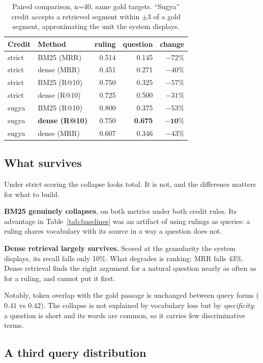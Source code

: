\documentclass[11pt,a4paper]{article}
\begin{document}
\begin{table}[h]
\centering
\begin{tabular}{llrrr}
\toprule
Credit & Method & ruling & question & change \\
\midrule
strict & BM25 (MRR) & 0.514 & 0.145 & $-72\%$ \\
strict & dense (MRR) & 0.451 & 0.271 & $-40\%$ \\
strict & BM25 (R@10) & 0.750 & 0.325 & $-57\%$ \\
strict & dense (R@10) & 0.725 & 0.500 & $-31\%$ \\
\midrule
sugya & BM25 (R@10) & 0.800 & 0.375 & $-53\%$ \\
sugya & \textbf{dense (R@10)} & 0.750 & \textbf{0.675} & $\mathbf{-10\%}$ \\
sugya & dense (MRR) & 0.607 & 0.346 & $-43\%$ \\
\bottomrule
\end{tabular}
\caption{Paired comparison, n=40, same gold targets. ``Sugya'' credit accepts a
retrieved segment within $\pm 3$ of a gold segment, approximating the unit the
system displays.}
\label{tab:questions}
\end{table}

\subsection{What survives}

Under strict scoring the collapse looks total. It is not, and the difference
matters for what to build.

\textbf{BM25 genuinely collapses}, on both metrics under both credit rules. Its
advantage in Table~\ref{tab:baselines} was an artifact of using rulings as
queries: a ruling shares vocabulary with its source in a way a question does not.

\textbf{Dense retrieval largely survives.} Scored at the granularity the system
displays, its recall falls only 10\%. What degrades is ranking: MRR falls 43\%.
Dense retrieval finds the right argument for a natural question nearly as often
as for a ruling, and cannot put it first.

Notably, token overlap with the gold passage is unchanged between query forms
($0.41$ vs $0.42$). The collapse is not explained by vocabulary loss but by
\emph{specificity}: a question is short and its words are common, so it carries
few discriminative terms.

\subsection{A third query distribution}
\end{document}
